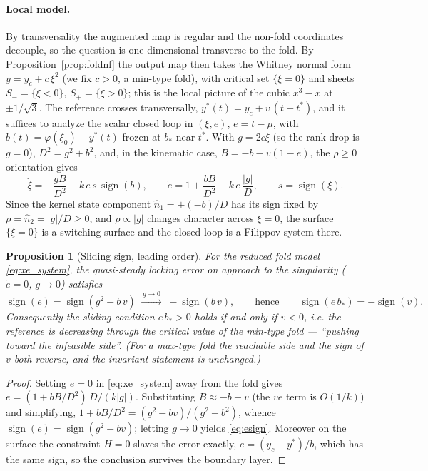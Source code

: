 \documentclass[11pt,american]{article}
\DeclareMathOperator{\sign}{sign}
\newtheorem{proposition}{Proposition}
\theoremstyle{definition}
\theoremstyle{plain}
\theoremstyle{remark}
\begin{document}
\paragraph{Local model.} By transversality the augmented map is regular and the non-fold coordinates decouple, so the question is one-dimensional transverse to the fold. By Proposition~\ref{prop:foldnf} the output map then takes the Whitney normal form $y = y_c + c\,\xi^2$ (we fix $c>0$, a min-type fold), with critical set $\{\xi=0\}$ and sheets $S_-=\{\xi<0\}$, $S_+=\{\xi>0\}$; this is the local picture of the cubic $x^3-x$ at $\pm 1/\sqrt3$. The reference crosses transversally, $y^*(t)=y_c+v\,(t-t^*)$, and it suffices to analyze the scalar closed loop in $(\xi,e)$, $e=t-\mu$, with $b(t)=\varphi(\xi_0)-y^*(t)$ frozen at $b_*$ near $t^*$. With $g = 2c\xi$ (so the rank drop is $g=0$), $D^2 = g^2 + b^2$, and, in the kinematic case, $B = -b - v(1-e)$, the $\rho\ge0$ orientation gives
\begin{equation}\label{eq:xe_system}
\dot\xi = -\frac{gB}{D^2} - k\,e\,s\,\sign(b), \qquad
\dot e = 1 + \frac{bB}{D^2} - k\,e\,\frac{|g|}{D}, \qquad s=\sign(\xi).
\end{equation}
Since the kernel state component $\hat n_1 = \pm(-b)/D$ has its sign fixed by $\rho = \hat n_2 = |g|/D \ge 0$, and $\rho \propto |g|$ changes character across $\xi=0$, the surface $\{\xi=0\}$ is a switching surface and the closed loop is a Filippov system there.

\begin{proposition}[Sliding sign, leading order]\label{prop:sign}
For the reduced fold model \eqref{eq:xe_system}, the quasi-steady locking error on approach to the singularity ($\dot e = 0$, $g\to0$) satisfies
\begin{equation}\label{eq:esign}
\sign(e) = \sign(g^2 - b\,v) \;\xrightarrow{\,g\to0\,}\; -\sign(b\,v),
\qquad\text{hence}\qquad \sign(e\,b_*) = -\sign(v).
\end{equation}
Consequently the sliding condition $e\,b_* > 0$ holds if and only if $v<0$, i.e. the reference is decreasing through the critical value of the min-type fold --- ``pushing toward the infeasible side''. (For a max-type fold the reachable side and the sign of $v$ both reverse, and the invariant statement is unchanged.)
\end{proposition}

\begin{proof}
Setting $\dot e = 0$ in \eqref{eq:xe_system} away from the fold gives $e = (1 + bB/D^2)\,D/(k|g|)$. Substituting $B \approx -b - v$ (the $ve$ term is $O(1/k)$) and simplifying, $1 + bB/D^2 = (g^2 - bv)/(g^2+b^2)$, whence $\sign(e) = \sign(g^2 - bv)$; letting $g\to0$ yields \eqref{eq:esign}. Moreover on the surface the constraint $H=0$ slaves the error exactly, $e = (y_c - y^*)/b$, which has the same sign, so the conclusion survives the boundary layer.
\end{proof}
\end{document}

